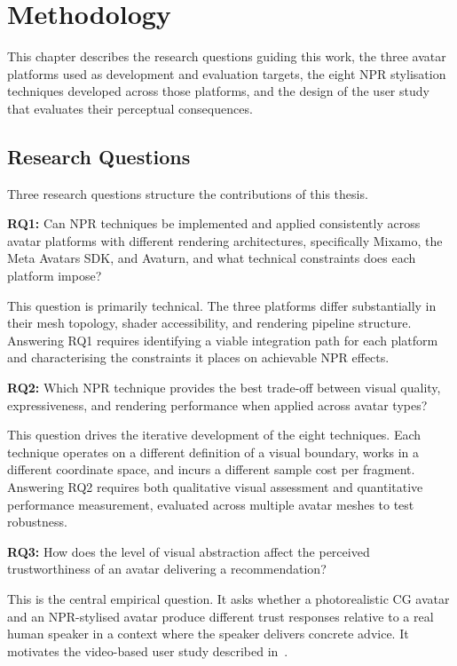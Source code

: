 \chapter{Methodology}
\label{ch:methodology}

This chapter describes the research questions guiding this work, the three avatar platforms used as development and evaluation targets, the eight NPR stylisation techniques developed across those platforms, and the design of the user study that evaluates their perceptual consequences.

\section{Research Questions}
\label{sec:research_questions}

Three research questions structure the contributions of this thesis.

\textbf{RQ1:} Can NPR techniques be implemented and applied consistently across avatar platforms with different rendering architectures, specifically Mixamo, the Meta Avatars SDK, and Avaturn, and what technical constraints does each platform impose?

This question is primarily technical. The three platforms differ substantially in their mesh topology, shader accessibility, and rendering pipeline structure. Answering RQ1 requires identifying a viable integration path for each platform and characterising the constraints it places on achievable NPR effects.

\textbf{RQ2:} Which NPR technique provides the best trade-off between visual quality, expressiveness, and rendering performance when applied across avatar types?

This question drives the iterative development of the eight techniques. Each technique operates on a different definition of a visual boundary, works in a different coordinate space, and incurs a different sample cost per fragment. Answering RQ2 requires both qualitative visual assessment and quantitative performance measurement, evaluated across multiple avatar meshes to test robustness.

\textbf{RQ3:} How does the level of visual abstraction affect the perceived trustworthiness of an avatar delivering a recommendation?

This is the central empirical question. It asks whether a photorealistic CG avatar and an NPR-stylised avatar produce different trust responses relative to a real human speaker in a context where the speaker delivers concrete advice. It motivates the video-based user study described in~.

